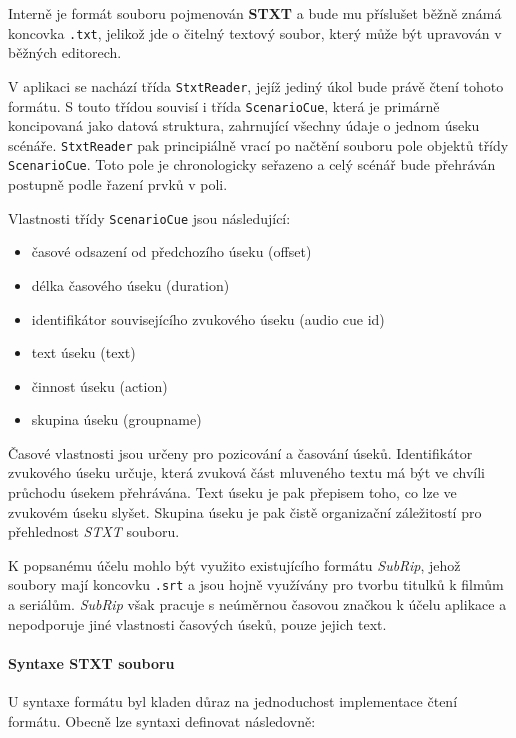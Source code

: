 Interně je formát souboru pojmenován \textbf{STXT} a bude mu příslušet
běžně známá koncovka \texttt{.txt}, jelikož jde o čitelný textový
soubor, který může být upravován v běžných editorech.

V aplikaci se nachází třída \texttt{StxtReader}, jejíž jediný úkol bude
právě čtení tohoto formátu. S touto třídou souvisí i třída 
\texttt{ScenarioCue}, která je primárně koncipovaná jako datová
struktura, zahrnující všechny údaje o jednom úseku scénáře.
\texttt{StxtReader} pak principiálně vrací po načtění souboru pole objektů třídy
\texttt{ScenarioCue}. Toto pole je chronologicky seřazeno a celý scénář
bude přehráván postupně podle řazení prvků v poli.

Vlastnosti třídy \texttt{ScenarioCue} jsou následující:

\begin{itemize}
\tightlist
\item
  časové odsazení od předchozího úseku (offset)
\item
  délka časového úseku (duration)
\item
  identifikátor souvisejícího zvukového úseku (audio cue id)
\item
  text úseku (text)
\item
  činnost úseku (action)
\item
  skupina úseku (groupname)
\end{itemize}

Časové vlastnosti jsou určeny pro pozicování a časování úseků.
Identifikátor zvukového úseku určuje, která zvuková část mluveného textu má být ve
chvíli průchodu úsekem přehrávána. Text úseku je pak přepisem toho, co
lze ve zvukovém úseku slyšet. Skupina úseku je pak čistě organizační
záležitostí pro přehlednost \emph{STXT} souboru.

K popsanému účelu mohlo být využito existujícího formátu \emph{SubRip},
jehož soubory mají koncovku \texttt{.srt} a jsou hojně využívány pro
tvorbu titulků k filmům a seriálům. \emph{SubRip} však pracuje s
neúměrnou časovou značkou k účelu aplikace a nepodporuje jiné vlastnosti
časových úseků, pouze jejich text.

\paragraph{Syntaxe STXT souboru}\label{syntaxe-stxt-souboru}

U syntaxe formátu byl kladen důraz na jednoduchost implementace čtení
formátu. Obecně lze syntaxi definovat následovně:

